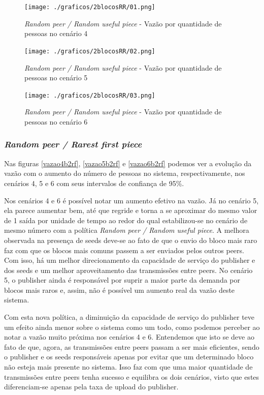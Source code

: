 \documentclass[a4paper,10pt]{article}
\begin{document}
\pagebreak

\begin{figure}
	\caption{\textit{Random peer / Random useful piece} - Vazão por quantidade de pessoas no cenário 4}
	\label{vazao4b2rr}
	\texttt{[image: ./graficos/2blocosRR/01.png]}
\end{figure}

\begin{figure}
	\caption{\textit{Random peer / Random useful piece} - Vazão por quantidade de pessoas no cenário 5}
	\label{vazao5b2rr}
	\texttt{[image: ./graficos/2blocosRR/02.png]}
\end{figure}

\clearpage
\pagebreak

\begin{figure}
	\caption{\textit{Random peer / Random useful piece} - Vazão por quantidade de pessoas no cenário 6}
	\label{vazao6b2rr}
	\texttt{[image: ./graficos/2blocosRR/03.png]}
\end{figure}

\pagebreak

\subsubsection{\textit{Random peer / Rarest first piece}}

Nas figuras \ref{vazao4b2rf}, \ref{vazao5b2rf} e \ref{vazao6b2rf} podemos ver a evolução da vazão com o aumento do número de pessoas no sistema, respectivamente, nos cenários 4, 5 e 6 com seus intervalos de confiança de 95\%.

Nos cenários 4 e 6 é possível notar um aumento efetivo na vazão. Já no cenário 5, ela parece aumentar bem, até que regride e torna a se aproximar do mesmo valor de 1 saída por unidade de tempo ao redor do qual estabilizou-se no cenário de mesmo número com a política \textit{Random peer / Random useful piece}. A melhora observada na presença de seeds deve-se ao fato de que o envio do bloco mais raro faz com que os blocos mais comuns passem a ser enviados pelos outros peers. Com isso, há um melhor direcionamento da capacidade de serviço do publisher e dos seeds e um melhor aproveitamento das transmissões entre peers. No cenário 5, o publisher ainda é responsável por suprir a maior parte da demanda por blocos mais raros e, assim, não é possível um aumento real da vazão deste sistema.

Com esta nova política, a diminuição da capacidade de serviço do publisher teve um efeito ainda menor sobre o sistema como um todo, como podemos perceber ao notar a vazão muito próxima nos cenários 4 e 6. Entendemos que isto se deve ao fato de que, agora, as transmissões entre peers passam a ser mais eficientes, sendo o publisher e os seeds responsáveis apenas por evitar que um determinado bloco não esteja mais presente no sistema. Isso faz com que uma maior quantidade de transmissões entre peers tenha sucesso e equilibra os dois cenários, visto que estes diferenciam-se apenas pela taxa de upload do publisher.
\end{document}
